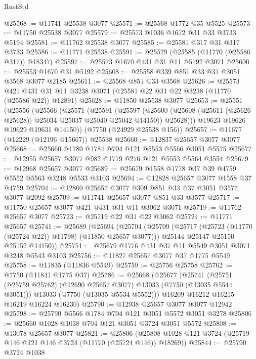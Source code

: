 \begin{lexlean}{RustStd}
\begin{coremodule}
@25568 := @11741 @25538 @3077
@25571 := @25568 @1772 @35 @5525
@25573 := @11750 @25538 @3077
@25579 := @25573 @1036 @1672 @31 @33 @3733 @5194
@25581 := @11762 @25538 @3077
@25585 := @25581 @317 @31 @317 @3733
@25586 := @11771 @25538
@25591 := @25579 (@25585 (@11770 (@25586 @317)) @18347)
@25597 := @25573 @1670 @431 @31 @11 @5192 @3071
@25600 := @25553 @1670 @31 @5192
@25608 := @25558 @339 @851 @33 @31 @3051 @3568 @3077 @2185
@25611 := @25568 @851 @33 @3568
@25626 := @25573
    @421
    @431
    @31
    @11
    @3238
    @3071
    (@25581 @22 @31 @22 @3238 (@11770 (@25586 @22)) @12891)
@25628 := @11850 @25538 @3077
@25653 := @25551
    (@25556
      (@25566
        (@25571
          (@25591
            (@25597
              (@25600 (@25608 (@25611 (@25626 @25628)) @25034 @25037 @25040 @25042 @14150))
              @25628)))
        @19623
        @19626
        @19629
        @19631
        @14150))
    (@7750 (@24929 @25538 @156))
@25657 := @11677 (@12229 (@12196 @15667)) @25538
@25660 := @12837 @25657 @3077 @3077
@25668 := @25660 @1780 @1784 @704 @121 @5553 @5566 @3051 @5575
@25677 := @12955 @25657 @3077 @982 @1779 @276 @121 @5553 @5564 @3554
@25679 := @12968 @25657 @3077
@25689 := @25679 @1558 @1778 @37 @39 @4759 @5552 @5563 @3248 @5533 @3103
@25694 := @12828 @25657 @3077 @1558 @37 @4759
@25704 := @12860 @25657 @3077 @309 @851 @33 @37 @3051 @3577 @3077 @2092
@25709 := @11741 @25657 @3077 @851 @33 @3577
@25717 := @11750 @25657 @3077 @421 @431 @31 @11 @3062 @3071
@25719 := @11762 @25657 @3077
@25723 := @25719 @22 @31 @22 @3062
@25724 := @11771 @25657
@25741 := @25689
    (@25694
      (@25704
        (@25709 (@25717 (@25723 (@11770 (@25724 @22)) @11798) (@11850 @25657 @3077)))
        @25144
        @25147
        @25150
        @25152
        @14150))
@25751 := @25679 @1776 @431 @37 @11 @5549 @3051 @3071 @3248 @5543 @3103
@25756 := @11827 @25657 @3077 @37 @1775 @5549
@25758 := @11835 (@11836 @5549)
@25759 := @25756 @25758
@25762 := @7750 (@11841 @1775 @37)
@25786 := @25668
    (@25677
      (@25741
        (@25751 (@25759 @25762) (@12690 @25657 @3077) @13033 (@7750 (@13035 @5544 @3051)))
        @13033
        (@7750 (@13035 @5534 @5552)))
      @16209
      @16212
      @16215
      @16219
      @16224
      @16230)
@25790 := @12938 @25657 @3077 @3077 @12942
@25798 := @25790 @5566 @1784 @704 @121 @3051 @5572 @3051 @3278
@25806 := @25660 @1028 @1038 @704 @121 @3051 @3724 @3051 @5572
@25808 := @13078 @25657 @3077
@25821 := @25806
    (@25808 @1028 @121 @3724 (@25719 @146 @121 @146 @3724 (@11770 (@25724 @146)) @18269))
@25844 := @25790
    @3724
    @1038

\end{coremodule}
\end{lexlean}
